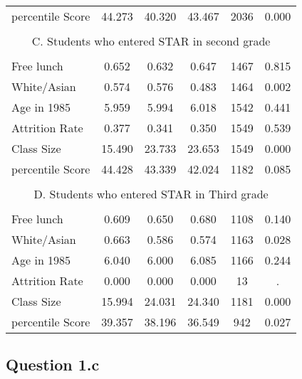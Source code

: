\documentclass{article}
\begin{document}
{{{\begin{table}[htbp]
\begin{tabular}{llccccc}
    \multicolumn{2}{l}{percentile Score} & 44.273  & 40.320  & 43.467  & 2036  & 0.000  \\
          &       &       &       &       &       &  \\
    \multicolumn{7}{c}{C. Students who entered STAR in second grade} \\
    \multicolumn{2}{c}{} &       &       &       &       &  \\
    \multicolumn{2}{l}{Free lunch} & 0.652  & 0.632  & 0.647  & 1467  & 0.815  \\
    \multicolumn{2}{l}{White/Asian} & 0.574  & 0.576  & 0.483  & 1464  & 0.002  \\
    \multicolumn{2}{l}{Age in 1985} & 5.959  & 5.994  & 6.018  & 1542  & 0.441  \\
    \multicolumn{2}{l}{Attrition Rate} & 0.377  & 0.341  & 0.350  & 1549  & 0.539  \\
    \multicolumn{2}{l}{Class Size} & 15.490  & 23.733  & 23.653  & 1549  & 0.000  \\
    \multicolumn{2}{l}{percentile Score} & 44.428  & 43.339  & 42.024  & 1182  & 0.085  \\
          &       &       &       &       &       &  \\
    \multicolumn{7}{c}{D. Students who entered STAR in Third grade} \\
    \multicolumn{2}{c}{} &       &       &       &       &  \\
    \multicolumn{2}{l}{Free lunch} & 0.609  & 0.650  & 0.680  & 1108  & 0.140  \\
    \multicolumn{2}{l}{White/Asian} & 0.663  & 0.586  & 0.574  & 1163  & 0.028  \\
    \multicolumn{2}{l}{Age in 1985} & 6.040  & 6.000  & 6.085  & 1166  & 0.244  \\
    \multicolumn{2}{l}{Attrition Rate} & 0.000  & 0.000  & 0.000  & 13    & . \\
    \multicolumn{2}{l}{Class Size} & 15.994  & 24.031  & 24.340  & 1181  & 0.000  \\
    \multicolumn{2}{l}{percentile Score} & 39.357  & 38.196  & 36.549  & 942   & 0.027  \\
    \bottomrule
    \bottomrule
    \end{tabular}%
  \label{tab:addlabel}%
\end{table}%




\subsection*{Question 1.c}

}}}
\end{document}
